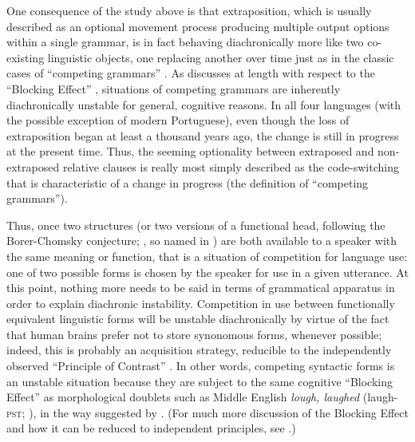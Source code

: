 One consequence of the study above is that extraposition, which is usually described as an optional movement process producing multiple output options within a single grammar, is in fact behaving diachronically more like two co-existing linguistic objects, one replacing another over time just as in the classic cases of ``competing grammars'' \citep[][etc.]{kroch1989, kroch1994, santorini1992}. As \citet{kroch1994} discusses at length with respect to the ``Blocking Effect'' \citep[an expanded understanding of the principle first proposed in ]{aronoff1976}, situations of competing grammars are inherently diachronically unstable for general, cognitive reasons. In all four languages (with the possible exception of modern Portuguese), even though the loss of extraposition began at least a thousand years ago, the change is still in progress at the present time. Thus, the seeming optionality between extraposed and non-extraposed relative clauses is really most simply described as the code-switching that is characteristic of a change in progress (the definition of ``competing grammars'').

Thus, once two structures (or two versions of a functional head, following the Borer-Chomsky conjecture; \citealt{borer1984, kroch1994}, so named in \citealt{baker2008}) are both available to a speaker with the same meaning or function, that is a situation of competition for language use: one of two possible forms is chosen by the speaker for use in a given utterance. At this point, nothing more needs to be said in terms of grammatical apparatus in order to explain diachronic instability. Competition in use between functionally equivalent linguistic forms will be unstable diachronically by virtue of the fact that human brains prefer not to store synonomous forms, whenever possible; indeed, this is probably an acquisition strategy, reducible to the independently observed ``Principle of Contrast'' \citep[][inter alia]{clark1987, clark1990}. In other words, competing syntactic forms is an unstable situation because they are subject to the same cognitive ``Blocking Effect'' as morphological doublets such as Middle English \textsl{lough, laughed} (laugh-\textsc{pst}; \citealt{taylor1994}), in the way suggested by \citet{kroch1994}.  (For much more discussion of the Blocking Effect and how it can be reduced to independent principles, see \citealt{fruehwaldwallenberginprep}.)

